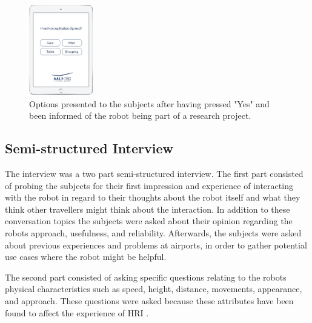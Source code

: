 \begin{figure}[H]
\centering
\includegraphics[width = 0.25\textwidth]{Figure/brug}
\caption{Options presented to the subjects after having pressed "Yes" and been informed of the robot being part of a research project.}
\label{fig:brug}
\end{figure}
\noindent
% 
\subsection{Semi-structured Interview}
The interview was a two part semi-structured interview. The first part consisted of probing the subjects for their first impression and experience of interacting with the robot in regard to their thoughts about the robot itself and what they think other travellers might think about the interaction. In addition to these conversation topics the subjects were asked about their opinion regarding the robots approach, usefulness, and reliability. Afterwards, the subjects were asked about previous experiences and problems at airports, in order to gather potential use cases where the robot might be helpful. 


%
%
The second part consisted of asking specific questions relating to the robots physical characteristics such as speed, height, distance, movements, appearance, and approach. These questions were asked because these attributes have been found to affect the experience of HRI \cite{PDF:HowMayIServeYou}.

